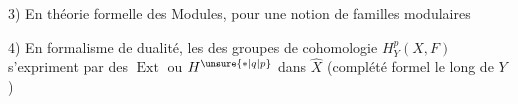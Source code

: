 \noindent{}3) En théorie formelle des Modules, pour   une notion de familles modulaires\par
\smallskip\noindent\usebox{\ScanEightItem}\par
\noindent{}
\endgroup

4) En formalisme de dualité, les  des groupes de cohomologie $H^p_Y(X,F)$ s'expriment par des $\operatorname{Ext}$ ou $H^{\unsure{*|q|p}}$ dans $\widehat X$ (complété formel le long de $Y$)

